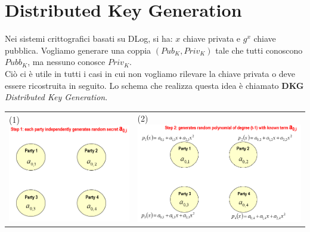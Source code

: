 \documentclass{book}
\begin{document}
\section{Distributed Key Generation}
Nei sistemi crittografici basati su DLog, si ha: \(x\) chiave privata e \(g^{x}\) chiave pubblica\@. Vogliamo generare una coppia \((Pub_{K},Priv_{K})\) tale che tutti conoscono \(Pubb_{K}\), ma nessuno conosce \(Priv_{K}\).\\ Ciò ci è utile in tutti i casi in cui non vogliamo rilevare la chiave privata o deve essere ricostruita in seguito\@.\newline
Lo schema che realizza questa idea è chiamato \textbf{DKG} \emph{Distributed Key Generation}\@.\newline
\begin{tabularx}{0.99\textwidth}{X X}
	(1)\includegraphics[scale=0.4]{2022-01-02-15-56-05.png}%
	 &
	(2)\includegraphics[scale=0.4]{2022-01-02-15-59-26.png}%

\end{tabularx}
\end{document}
